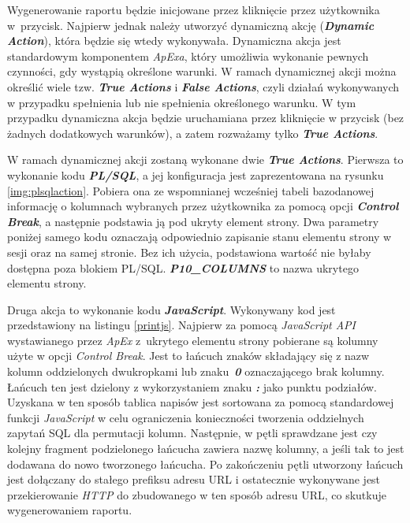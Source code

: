 \documentclass[11pt,a4paper]{article}
\begin{document}
Wygenerowanie raportu będzie inicjowane przez kliknięcie przez użytkownika w~przycisk. Najpierw jednak należy utworzyć dynamiczną akcję (\emph{\textbf{Dynamic Action}}), która będzie się wtedy wykonywała. Dynamiczna akcja jest standardowym komponentem \emph{ApExa}, który umożliwia wykonanie pewnych czynności, gdy wystąpią określone warunki. W ramach dynamicznej akcji można określić wiele tzw. \emph{\textbf{True Actions}} i \emph{\textbf{False Actions}}, czyli działań wykonywanych w przypadku spełnienia lub nie spełnienia określonego warunku. W tym przypadku dynamiczna akcja będzie uruchamiana przez kliknięcie w przycisk (bez żadnych dodatkowych warunków), a zatem rozważamy tylko \emph{\textbf{True Actions}}.

W ramach dynamicznej akcji zostaną wykonane dwie \emph{\textbf{True Actions}}. Pierwsza to wykonanie kodu \emph{\textbf{PL/SQL}}, a jej konfiguracja jest zaprezentowana na rysunku \ref{img:plsqlaction}. Pobiera ona ze wspomnianej wcześniej tabeli bazodanowej informację o kolumnach wybranych przez użytkownika za pomocą opcji \emph{\textbf{Control Break}}, a następnie podstawia ją pod ukryty element strony. Dwa parametry poniżej samego kodu oznaczają odpowiednio zapisanie stanu elementu strony w sesji oraz na samej stronie. Bez ich użycia, podstawiona wartość nie byłaby dostępna poza blokiem PL/SQL. \textbf{\emph{P10\_COLUMNS}} to nazwa ukrytego elementu strony. 

Druga akcja to wykonanie kodu \emph{\textbf{JavaScript}}. Wykonywany kod jest przedstawiony na listingu \ref{printjs}. Najpierw za pomocą \emph{JavaScript API} wystawianego przez \emph{ApEx} z~ukrytego elementu strony pobierane są kolumny użyte w opcji \emph{Control Break}. Jest to łańcuch znaków składający się z nazw kolumn oddzielonych dwukropkami lub znaku~\emph{\textbf{0}} oznaczającego brak kolumny. Łańcuch ten jest dzielony z wykorzystaniem znaku \emph{\textbf{:}} jako punktu podziałów. Uzyskana w ten sposób tablica napisów jest sortowana za pomocą standardowej funkcji \emph{JavaScript} w celu ograniczenia konieczności tworzenia oddzielnych zapytań SQL dla permutacji kolumn. Następnie, w pętli sprawdzane jest czy kolejny fragment podzielonego łańcucha zawiera nazwę kolumny, a jeśli tak to jest dodawana do nowo tworzonego łańcucha. Po zakończeniu pętli utworzony łańcuch jest dołączany do stałego prefiksu adresu URL i ostatecznie wykonywane jest przekierowanie \emph{HTTP} do zbudowanego w ten sposób adresu URL, co skutkuje wygenerowaniem raportu.
\end{document}
